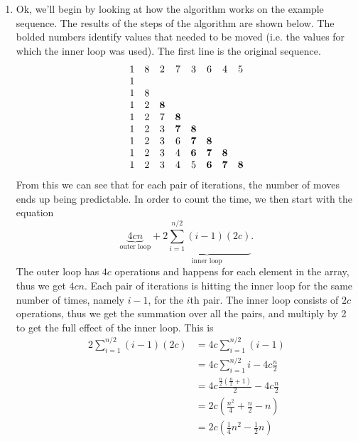 \documentclass{article}
\begin{document}
\begin{enumerate}[label=(\alph*)]
\item[] 
Ok, we'll begin by looking at how the algorithm works on the example
sequence.  The results of the steps of the algorithm are shown below.
The bolded numbers identify values that needed to be moved (i.e. the
values for which the inner loop was used). The first line is the
original sequence.
\begin{equation}
  \begin{matrix}
    1 & 8 & 2 & 7& 3  &6 & 4 & 5\\
    1 &&&&&&&\\
    1 & 8 &&&&&&\\
    1 & 2 & {\bf 8}&&&&&\\ 
    1 & 2 & 7 & {\bf 8}&&&&\\
    1 & 2 & 3 & {\bf 7}&{\bf 8}  &&&\\
    1 & 2 & 3 & 6& {\bf 7}&{\bf 8}  &&\\
    1 & 2 & 3 & 4& {\bf 6}& {\bf 7}&{\bf 8}  &\\
    1 & 2 & 3 & 4& 5  &{\bf 6} & {\bf 7}&{\bf 8} \\
  \end{matrix}
\end{equation}
From this we can see that for each pair of iterations, the number of
moves ends up being predictable.  In order to count the time, we then
start with the equation
\begin{equation}
  \underbrace{4cn}_{\text{outer loop}} + \underbrace{2 \sum_{i=1}^{n/2}
    (i-1)(2c)}_{\text{inner loop}}.
\end{equation}
The outer loop has $4c$ operations and happens for each element in the
array, thus we get $4cn$.   Each pair of iterations is hitting the
inner loop for the same number of times, namely $i-1$, for the $i$th
pair. The inner loop consists of $2c$ operations, thus we get the
summation over all the pairs, and multiply by 2 to get the full effect
of the inner loop.  This is
\begin{equation}
  \begin{split}
    2 \sum_{i=1}^{n/2}
    (i-1)(2c) &= 4c \sum_{i=1}^{n/2}(i - 1)\\
    &= 4c \sum_{i=1}^{n/2}i  - 4c\frac{n}{2}\\
    &= 4c \frac{\frac{n}{2}\left(\frac{n}{2} + 1\right)}{2} -
    4c\frac{n}{2}\\ 
    &= 2c\left(\frac{n^2}{4} + \frac{n}{2} - n\right)\\
    &= 2c\left(\frac{1}{4}n^2 - \frac{1}{2}n\right)
  \end{split}

\end{equation}
\end{enumerate}
\end{document}
